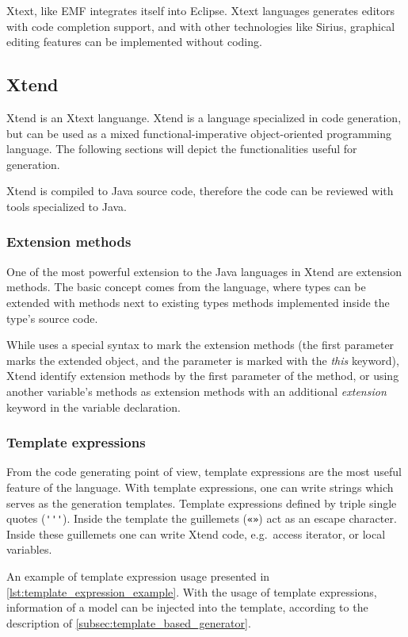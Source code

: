 Xtext, like EMF integrates itself into Eclipse. Xtext languages generates editors with code completion support, and with other technologies like Sirius, graphical editing features can be implemented without coding.

\subsection{Xtend}

Xtend is an Xtext languange. Xtend is a language specialized in \mtt{} code generation, but can be used as a mixed functional-imperative object-oriented programming language. The following sections will depict the functionalities useful for \mtt{} generation.

Xtend is compiled to Java source code, therefore the code can be reviewed with tools specialized to Java.

\subsubsection{Extension methods}

One of the most powerful extension to the Java languages in Xtend are extension methods. The basic concept comes from the  language, where types can be extended with methods next to existing types methods implemented inside the type's source code.

While  uses a special syntax to mark the extension methods (the first parameter marks the extended object, and the parameter is marked with the \emph{this} keyword), Xtend identify extension methods by the first parameter of the method, or using another variable's methods as extension methods with an additional \emph{extension} keyword in the variable declaration.

\subsubsection{Template expressions}

From the code generating point of view, template expressions are the most useful feature of the language. With template expressions, one can write strings which serves as the generation templates. Template expressions defined by triple single quotes (\verb+'''+). Inside the template the guillemets (\verb+«»+) act as an escape character. Inside these guillemets one can write Xtend code, e.g.\ access iterator, or local variables.

An example of template expression usage presented in \cref{lst:template_expression_example}. With the usage of template expressions, information of a model can be injected into the template, according to the description of \cref{subsec:template_based_generator}.

